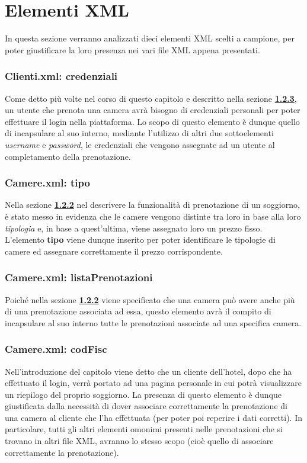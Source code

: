 \documentclass [a4paper, 12pt]{book}
\begin{document}
\medskip
\medskip

\section{Elementi XML}
In questa sezione verranno analizzati dieci elementi XML scelti a campione, per poter giustificare la loro presenza nei vari file XML appena presentati.

\subsubsection{Clienti.xml: credenziali}
Come detto più volte nel corso di questo capitolo e descritto nella sezione \hyperref[Login]{\textbf{1.2.3}}, un utente che prenota una camera avrà bisogno di credenziali personali per poter effettuare il login nella piattaforma. Lo scopo di questo elemento è dunque quello di incapsulare al suo interno, mediante l'utilizzo di altri due sottoelementi \textit{username} e \textit{password}, le credenziali che vengono assegnate ad un utente al completamento della prenotazione.

\subsubsection{Camere.xml: tipo}
Nella sezione \hyperref[PrenotazioneCamera]{\textbf{1.2.2}} nel descrivere la funzionalità di prenotazione di un soggiorno, è stato messo in evidenza che le camere vengono distinte tra loro in base alla loro \textit{tipologia} e, in base a quest'ultima, viene assegnato loro un prezzo fisso. L'elemento \textbf{tipo} viene dunque inserito per poter identificare le tipologie di camere ed assegnare correttamente il prezzo corrispondente.

\subsubsection{Camere.xml: listaPrenotazioni}
Poiché nella sezione \hyperref[PrenotazioneCamera]{\textbf{1.2.2}} viene specificato che una camera può avere anche più di una prenotazione associata ad essa, questo elemento avrà il compito di incapsulare al suo interno tutte le prenotazioni associate ad una specifica camera.

\subsubsection{Camere.xml: codFisc}
Nell'introduzione del capitolo viene detto che un cliente dell'hotel, dopo che ha effettuato il login, verrà portato ad una pagina personale in cui potrà visualizzare un riepilogo del proprio soggiorno. La presenza di questo elemento è dunque giustificata dalla necessità di dover associare correttamente la prenotazione di una camera al cliente che l'ha effettuata (per poter poi reperire i dati corretti). In particolare, tutti gli altri elementi omonimi presenti nelle prenotazioni che si trovano in altri file XML, avranno lo stesso scopo (cioè quello di associare correttamente la prenotazione).
\end{document}
